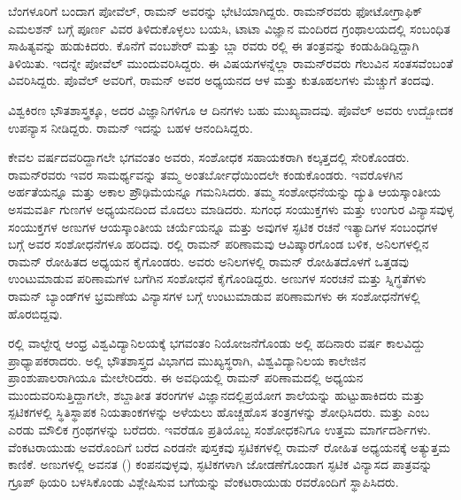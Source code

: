 ಬೆಂಗಳೂರಿಗೆ ಬಂದಾಗ ಪೋವೆಲ್, ರಾಮನ್ ಅವರನ್ನು ಭೇಟಿಯಾಗಿದ್ದರು. ರಾಮನ್‍ರವರು ಫೋಟೋಗ್ರಾಫಿಕ್ ಎಮಲಶನ್ ಬಗ್ಗೆ ಪೂರ್ಣ ವಿವರ ತಿಳಿದುಕೊಳ್ಳಲು ಬಯಸಿ, ಟಾಟಾ ವಿಜ್ಞಾನ ಮಂದಿರದ ಗ್ರಂಥಾಲಯದಲ್ಲಿ ಸಂಬಂಧಿತ ಸಾಹಿತ್ಯವನ್ನು ಹುಡುಕಿದರು. ಕೊನೆಗೆ ವಂಬಶೇರ್ ಮತ್ತು ಬ್ಲಾ ರವರು ರಲ್ಲಿ ಈ ತಂತ್ರವನ್ನು ಕಂಡುಹಿಡಿದ್ದಿದ್ದಾಗಿ ತಿಳಿಯಿತು. ಇದನ್ನೇ ಪೋವೆಲ್ ಮುಂದುವರಿಸಿದ್ದರು. ಈ ವಿಷಯಗಳನ್ನೆಲ್ಲಾ ರಾಮನ್‍ರವರು ಗೆಲುವಿನ ಸಂತಸವೆಂಬಂತೆ ವಿವರಿಸಿದ್ದರು. ಪೊವೆಲ್ ಅವರಿಗೆ, ರಾಮನ್ ಅವರ ಅಧ್ಯಯನದ ಆಳ ಮತ್ತು ಕುತೂಹಲಗಳು ಮೆಚ್ಚುಗೆ ತಂದವು.

ವಿಶ್ವಕಿರಣ ಭೌತಶಾಸ್ತ್ರಕ್ಕೂ, ಅದರ ವಿಜ್ಞಾನಿಗಳಿಗೂ ಆ ದಿನಗಳು ಬಹು ಮುಖ್ಯವಾದವು. ಪೊವೆಲ್ ಅವರು ಉದ್ಬೋದಕ ಉಪನ್ಯಾಸ ನೀಡಿದ್ದರು. ರಾಮನ್ ಇದನ್ನು ಬಹಳ ಆನಂದಿಸಿದ್ದರು.



ಕೇವಲ  ವರ್ಷದವರಿದ್ದಾಗಲೇ ಭಗವಂತಂ ಅವರು, ಸಂಶೋಧಕ ಸಹಾಯಕರಾಗಿ ಕಲ್ಕತ್ತದಲ್ಲಿ ಸೇರಿಕೊಂಡರು. ರಾಮನ್‍ರವರು ಇವರ ಸಾಮರ್ಥ್ಯವನ್ನು ತಮ್ಮ ಅಂತರ್ಬೋಧೆಯಿಂದಲೇ ಕಂಡುಕೊಂಡರು. ಇವರೊಳಗಿನ ಅರ್ಹತೆಯನ್ನೂ ಮತ್ತು ಅಕಾಲ ಪ್ರೌಢಿಮೆಯನ್ನೂ ಗಮನಿಸಿದರು. ತಮ್ಮ ಸಂಶೋಧನೆಯನ್ನು ದ್ಯುತಿ ಆಯಸ್ಕಾಂತೀಯ ಅಸಮವರ್ತಿ ಗುಣಗಳ ಅಧ್ಯಯನದಿಂದ ಮೊದಲು ಮಾಡಿದರು. ಸುಗಂಧ ಸಂಯುಕ್ತಗಳು ಮತ್ತು ಉಂಗುರ ವಿನ್ಯಾಸವುಳ್ಳ ಸಂಯುಕ್ತಗಳ ಅಣುಗಳ ಆಯಸ್ಕಾಂತೀಯ ಚರ್ಯೆಯನ್ನೂ ಮತ್ತು ಅವುಗಳ ಸ್ಫಟಿಕ ರಚನೆ ಇತ್ಯಾದಿಗಳ ಸಂಬಂಧಗಳ ಬಗ್ಗೆ ಅವರ ಸಂಶೋಧನೆಗಳೂ ಹರಿದವು. ರಲ್ಲಿ ರಾಮನ್ ಪರಿಣಾಮವು ಆವಿಷ್ಕಾರಗೊಂಡ ಬಳಿಕ, ಅನಿಲಗಳಲ್ಲಿನ ರಾಮನ್ ರೋಹಿತದ ಅಧ್ಯಯನ ಕೈಗೊಂಡರು. ಅವರು ಅನಿಲಗಳಲ್ಲಿ ರಾಮನ್ ರೋಹಿತದೊಳಗೆ ಒತ್ತಡವು ಉಂಟುಮಾಡುವ ಪರಿಣಾಮಗಳ ಬಗೆಗಿನ ಸಂಶೋಧನೆ ಕೈಗೊಂಡಿದ್ದರು. ಅಣುಗಳ ಸಂರಚನೆ ಮತ್ತು ಸ್ನಿಗ್ಧತೆಗಳು ರಾಮನ್ ಬ್ಯಾಂಡ್‍ಗಳ ಭ್ರಮಣೆಯ ವಿನ್ಯಾಸಗಳ ಬಗ್ಗೆ ಉಂಟುಮಾಡುವ ಪರಿಣಾಮಗಳು ಈ ಸಂಶೋಧನೆಗಳಲ್ಲಿ ಹೊರಬಿದ್ದವು.

\vskip 1pt

ರಲ್ಲಿ ವಾಲ್ಟೇರ್‍ನ ಆಂಧ್ರ ವಿಶ್ವವಿದ್ಯಾನಿಲಯಕ್ಕೆ ಭಗವಂತಂ ನಿಯೋಜನೆಗೊಂಡು ಅಲ್ಲಿ ಹದಿನಾರು ವರ್ಷ ಕಾಲವಿದ್ದು ಪ್ರಾಧ್ಯಾಪಕರಾದರು. ಅಲ್ಲಿ ಭೌತಶಾಸ್ತ್ರದ ವಿಭಾಗದ ಮುಖ್ಯಸ್ಥರಾಗಿ, ವಿಶ್ವವಿದ್ಯಾನಿಲಯ ಕಾಲೇಜಿನ ಪ್ರಾಂಶುಪಾಲರಾಗಿಯೂ ಮೇಲೇರಿದರು. ಈ ಅವಧಿಯಲ್ಲಿ ರಾಮನ್ ಪರಿಣಾಮದಲ್ಲಿ ಅಧ್ಯಯನ ಮುಂದುವರಿಸುತ್ತಿದ್ದಾಗಲೇ, ಶಬ್ದಾತೀತ ತರಂಗಗಳ ವಿಜ್ಞಾನದಲ್ಲಿ\break ಪ್ರಯೋಗ ಶಾಲೆಯನ್ನು ಹುಟ್ಟುಹಾಕಿದರು ಮತ್ತು ಸ್ಪಟಿಕಗಳಲ್ಲಿ ಸ್ಥಿತಿಸ್ಥಾಪಕ ನಿಯತಾಂಕಗಳನ್ನು ಅಳೆಯಲು ಹೊಚ್ಚಹೊಸ ತಂತ್ರಗಳನ್ನು ಶೋಧಿಸಿದರು. \textit{} ಮತ್ತು \textit{} ಎಂಬ ಎರಡು ಮೌಲಿಕ ಗ್ರಂಥಗಳನ್ನು ಬರೆದರು. ಇವರೆಡೂ ಪ್ರತಿಯೊಬ್ಬ ಸಂಶೋಧಕನಿಗೂ ಉತ್ತಮ ಮಾರ್ಗದರ್ಶಿಗಳು. ವೆಂಕಟರಾಯುಡು ಅವರೊಂದಿಗೆ ಬರೆದ ಎರಡನೇ ಪುಸ್ತಕವು ಸ್ಫಟಿಕಗಳಲ್ಲಿ ರಾಮನ್ ರೋಹಿತ ಅಧ್ಯಯನಕ್ಕೆ ಅತ್ಯುತ್ತಮ ಕಾಣಿಕೆ. ಅಣುಗಳಲ್ಲಿ ಅವನತ () ಕಂಪನವುಳ್ಳವು, ಸ್ಫಟಿಕಗಳಾಗಿ ಜೋಡಣೆಗೊಂಡಾಗ ಸ್ಫಟಿಕ ವಿನ್ಯಾಸದ ಪಾತ್ರವನ್ನು ಗ್ರೂಪ್ ಥಿಯರಿ ಬಳಸಿಕೊಂಡು ವಿಶ್ಲೇಷಿಸುವ ಬಗೆಯನ್ನು ವೆಂಕಟರಾಯುಡು ರವರೊಂದಿಗೆ ಸ್ಥಾಪಿಸಿದರು.

